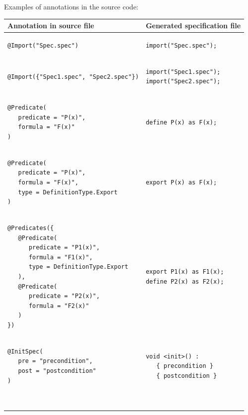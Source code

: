 \documentclass{article}
\begin{document}
Examples of annotations in the source code:\\
\begin{longtable}{ m{7cm} | m{5cm} }
Annotation in source file & Generated specification file \\
\hline
\begin{verbatim}
@Import("Spec.spec")
\end{verbatim}
& 
\begin{verbatim}
import("Spec.spec");
\end{verbatim}
\\
\begin{verbatim}
@Import({"Spec1.spec", "Spec2.spec"})
\end{verbatim}
& 
\begin{verbatim}
import("Spec1.spec");
import("Spec2.spec");
\end{verbatim}
\\
\begin{verbatim}
@Predicate(
   predicate = "P(x)", 
   formula = "F(x)"
)
\end{verbatim} 
&
\begin{verbatim}
define P(x) as F(x);
\end{verbatim}
\\
\begin{verbatim}
@Predicate(
   predicate = "P(x)", 
   formula = "F(x)", 
   type = DefinitionType.Export
)
\end{verbatim}  
&
\begin{verbatim}
export P(x) as F(x);
\end{verbatim}\\
\begin{verbatim}
@Predicates({
   @Predicate(
      predicate = "P1(x)", 
      formula = "F1(x)", 
      type = DefinitionType.Export
   ),
   @Predicate(
      predicate = "P2(x)", 
      formula = "F2(x)"
   )
})
\end{verbatim} 
& 
\begin{verbatim}
export P1(x) as F1(x);
define P2(x) as F2(x);
\end{verbatim}
\\
\begin{verbatim}
@InitSpec(
   pre = "precondition", 
   post = "postcondition"
)
\end{verbatim}
&
\begin{verbatim}
void <init>() :
   { precondition }
   { postcondition }
\end{verbatim}
\\
\begin{verbatim}

\end{verbatim}
\end{longtable}
\end{document}
